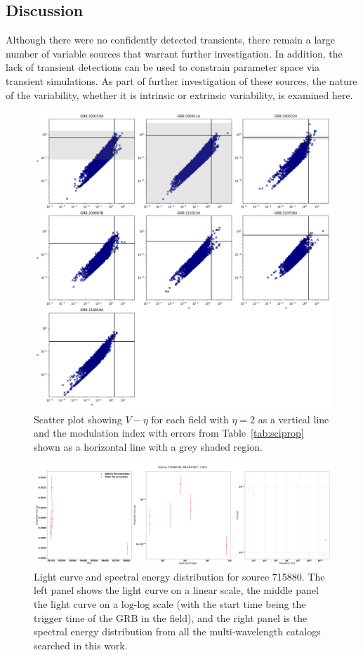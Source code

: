 \documentclass[12pt]{article}
\begin{document}
\subsection{Discussion}
\label{sec:discussion}
Although there were no confidently detected transients, there remain a large number of variable sources that warrant further investigation. In addition, the lack of transient detections can be used to constrain parameter space via transient simulations. As part of further investigation of these sources, the nature of the variability, whether it is intrinsic or extrinsic variability, is examined here.

\begin{figure}
	\includegraphics[width=\textwidth]{allfieldsvar.png}
	\caption{Scatter plot showing $V-\eta$ for each field with $\eta=2$ as a vertical line and the modulation index with errors from Table~\ref{tab:sciprop} shown as a horizontal line with a grey shaded region.}
	\label{fig:allfieldsvar}
\end{figure}

\begin{figure}
	\includegraphics[width=\textwidth]{src715880lc4.png}
	\caption{Light curve and spectral energy distribution for source 715880. The left panel shows the light curve on a linear scale, the middle panel the light curve on a log-log scale (with the start time being the trigger time of the GRB in the field), and the right panel is the spectral energy distribution from all the multi-wavelength catalogs searched in this work.}
	\label{fig:src715880lc4.png}
\end{figure}
\end{document}
